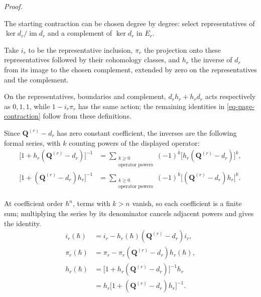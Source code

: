 \documentclass[11pt]{article}
\numberwithin{equation}{section}
\numberwithin{figure}{section}
\numberwithin{table}{section}
\begin{document}
\begin{proofbox}
\emph{Proof.}

The starting contraction can be chosen degree by degree: select representatives of $\ker d_r/\operatorname{im}d_r$ and a complement of $\ker d_r$ in $E_r$.

Take $i_r$ to be the representative inclusion, $\pi_r$ the projection onto these representatives followed by their cohomology classes, and $h_r$ the inverse of $d_r$ from its image to the chosen complement, extended by zero on the representatives and the complement.

On the representatives, boundaries and complement, $d_rh_r+h_rd_r$ acts respectively as $0,1,1$, while $1-i_r\pi_r$ has the same action; the remaining identities in \eqref{eq-page-contraction} follow from these definitions.

Since $\mathbf Q^{(r)}-d_r$ has zero constant coefficient, the inverses are the following formal series, with $k$ counting powers of the displayed operator:
\begin{equation}\label{eq-ch8-transfer-inverses}
\begin{aligned}
\bigl[1+h_r(\mathbf Q^{(r)}-d_r)\bigr]^{-1}
&=\sum_{\substack{k\ge0\\\text{operator powers}}}
(-1)^k\bigl[h_r(\mathbf Q^{(r)}-d_r)\bigr]^k,\\
\bigl[1+(\mathbf Q^{(r)}-d_r)h_r\bigr]^{-1}
&=\sum_{\substack{k\ge0\\\text{operator powers}}}
(-1)^k\bigl[(\mathbf Q^{(r)}-d_r)h_r\bigr]^k.
\end{aligned}
\end{equation}

At coefficient order $\hbar^n$, terms with $k>n$ vanish, so each coefficient is a finite sum; multiplying the series by its denominator cancels adjacent powers and gives the identity.
\begin{equation}\label{eq-ch8-transfer-resolvent-identities}
\begin{aligned}
i_r(\hbar)&=i_r-h_r(\hbar)(\mathbf Q^{(r)}-d_r)i_r,\\
\pi_r(\hbar)&=\pi_r-\pi_r(\mathbf Q^{(r)}-d_r)h_r(\hbar),\\
h_r(\hbar)&=\bigl[1+h_r(\mathbf Q^{(r)}-d_r)\bigr]^{-1}h_r\\
&=h_r\bigl[1+(\mathbf Q^{(r)}-d_r)h_r\bigr]^{-1}.
\end{aligned}
\end{equation}


\end{proofbox}
\end{document}
